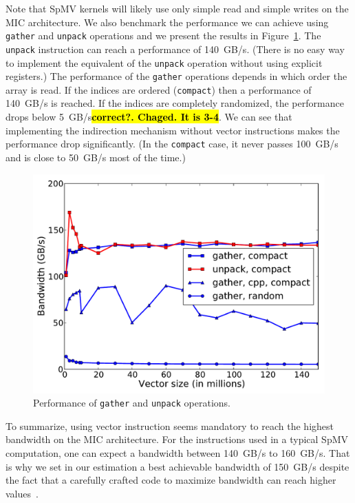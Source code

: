 \documentclass[10pt,conference,compsocconf]{IEEEtran}
\newcommand{\todo}[1]{{\color{red}\textbf{\hl{#1}}\xspace}}
\begin{document}
Note that SpMV kernels will likely use only simple read and simple
writes on the MIC architecture. We also benchmark the performance we
can achieve using {\tt gather} and {\tt unpack} operations and we
present the results in Figure~\ref{fig:band_gather}. The {\tt unpack}
instruction can reach a performance of 140~GB/s. (There is no easy way
to implement the equivalent of the {\tt unpack} operation without
using explicit registers.) The performance of the {\tt gather}
operations depends in which order the array is read. If the indices
are ordered ({\tt compact}) then a performance of 140~GB/s is
reached. If the indices are completely randomized, the performance
drops below 5~GB/s\todo{correct?. Chaged. It is 3-4}. We can see that implementing the
indirection mechanism without vector instructions makes the
performance drop significantly. (In the {\tt compact} case, it never
passes 100~GB/s and is close to 50~GB/s most of the time.)

\begin{figure}
  \centering
  \includegraphics[width=.9\linewidth]{figures/bandwidth_gather_unpack.pdf}
  \caption{Performance of {\tt gather} and {\tt unpack} operations.}
  \label{fig:band_gather} 
\end{figure}
%

To summarize, using vector instruction seems mandatory to reach the
highest bandwidth on the MIC architecture. For the instructions used
in a typical SpMV computation, one can expect a bandwidth between
140~GB/s to 160~GB/s. That is why we set in our estimation a best
achievable bandwidth of 150~GB/s despite the fact that a 
carefully crafted code to maximize bandwidth can reach higher
values~\cite{Saule13-ARXIV}. 
\end{document}
